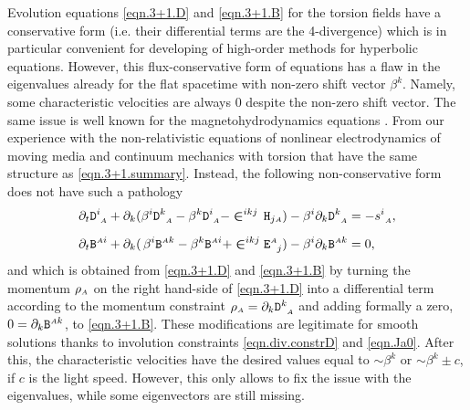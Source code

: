 \documentclass[
10pt, %
a4paper, %
oneside, %
twocolumn,
headinclude,footinclude, %
BCOR5mm, %
]{scrartcl}
\newcommand{\sA}{\mathsmaller A}
\newcommand{\pd}[1]{\partial_{#1}}
\newcommand{\stress}[2]{s_{\ #1}^{#2}}
\newcommand{\Dfin}[2]{\mathtt{D}_{\phantom{#2}#1}^{#2}}	%
\newcommand{\Hfin}[2]{\mathtt{H}_{#2#1}}	%
\newcommand{\Efin}[2]{\mathtt{E}^{#1}_{\phantom{#1}#2}}	%
\newcommand{\Bfin}[2]{\mathtt{B}^{#1#2}}	%
\newcommand{\LCsymb}{\bm{\in}}    %
\newcommand{\shift}[1]{\beta^{#1}}
\begin{document}
	
	Evolution equations \eqref{eqn.3+1.D} and \eqref{eqn.3+1.B} for the torsion fields have a 
	conservative form (i.e. their differential 
	terms are the 4-divergence) which is in particular convenient for developing of high-order 
	methods 
	for hyperbolic equations.
	However, this flux-conservative form of equations has a flaw in the eigenvalues already for the 
	flat spacetime with non-zero shift vector $ \shift{k} $. Namely, some characteristic velocities 
	are 
	always $ 0 $ despite the non-zero shift vector. The same issue is well known for the 
	magnetohydrodynamics 
	equations \cite{Powell1999}. From our experience with the non-relativistic equations 
	of nonlinear electrodynamics of 
	moving media \cite{DPRZ2017} and continuum mechanics with torsion \cite{Torsion2019} that have 
	the 
	same structure as \eqref{eqn.3+1.summary}. 
	Instead, the following non-conservative form does not have 
	such a pathology
	\begin{subequations}\label{eqn.BD.alt}
		\begin{align}
			\pd{t} \Dfin{\sA}{i} + \pd{k}(\shift{i} 
			\Dfin{\sA}{k} - \shift{k}\Dfin{\sA}{i}  - \LCsymb^{ikj} \,
			\Hfin{\sA}{j}) 
			-\shift{i}\pd{k} \Dfin{\sA}{k}
			& 
			= - \stress{\sA}{i},
			\label{eqn.BD.alt.D}
			\\[2mm]
			\pd{t} \Bfin{\sA}{i} + \pd{k}(\,\shift{i} 
			\Bfin{\sA}{k} - \shift{k}\Bfin{\sA}{i}  + \LCsymb^{ikj} 
			\Efin{\sA}{j}) 
			-\shift{i}\pd{k} \Bfin{\sA}{k}
			& 
			= 0,
			\label{eqn.BD.alt.B}
		\end{align}
	\end{subequations}
	and which is obtained from \eqref{eqn.3+1.D} and \eqref{eqn.3+1.B} by turning the momentum $ 
	\rho_\sA 
	$ on the right hand-side of \eqref{eqn.3+1.D} into a differential term according to the 
	momentum 
	constraint $ 
	\rho_\sA = \pd{k}\Dfin{\sA}{k} $ and adding formally a zero, $ 0 = 
	\pd{k}\Bfin{\sA}{k} $, to 
	\eqref{eqn.3+1.B}. These modifications are legitimate for smooth solutions thanks to involution 
	constraints \eqref{eqn.div.constrD} and \eqref{eqn.Ja0}. After this, the characteristic 
	velocities 
	have the desired values equal to $ \sim\shift{k} $ or $ \sim \shift{k} \pm c $, if $ c $ is the 
	light 
	speed. 
	However, this only allows to fix the issue with the eigenvalues, while some eigenvectors are 
	still 
	missing.
	
\end{document}
